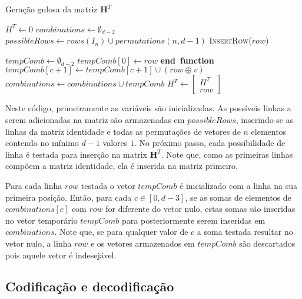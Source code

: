 \begin{algorithm}
\label{alg:geracao_matriz}
\caption{Geração gulosa da matriz $\textbf{H}^T$}
\begin{algorithmic}[1]
\State $H^T \gets 0$
\State $combinations \gets \emptyset_{d-2}$
\State $possibleRows \gets rows(I_n) \cup permutations(n, d - 1)$
    \State \textsc{InsertRow($row$)}
\EndFor

    \State $tempComb \gets \emptyset_{d-2}$
    \State $tempComb[0] \gets row$
                \State \textbf{end\ function}
            \EndIf
                \State $tempComb[c + 1] \gets tempComb[c+1] \cup (row \oplus v)$
            \EndIf
        \EndFor
    \EndFor
    \State $combinations \gets combinations \cup tempComb$
    \State $H^T \gets \begin{bmatrix} H^T \\ row \end{bmatrix}$
\EndFunction
\end{algorithmic}
\end{algorithm}

Neste código, primeiramente as variáveis são inicializadas. As possíveis linhas a serem adicionadas na matriz são armazenadas em $possibleRows$, inserindo-se as linhas da matriz identidade e todas as permutações de vetores de $n$ elementos contendo no mínimo $d - 1$ valores $1$. No próximo passo, cada possibilidade de linha é testada para inserção na matrix $\textbf{H}^T$. Note que, como as primeiras linhas compõem a matriz identidade, ela é inserida na matriz primeiro. 

Para cada linha $row$ testada o vetor $tempComb$ é inicializado com a linha na sua primeira posição. Então, para cada $c \in [0, d-3]$, se as somas de elementos de $combinations[c]$ com $row$ for diferente do vetor nulo, estas somas são inseridas no vetor temporário $tempComb$ para posteriormente serem inseridas em $combinations$. Note que, se para qualquer valor de $c$ a soma testada resultar no vetor nulo, a linha $row$ e os vetores armazenados em $tempComb$ são descartados pois aquele vetor é indesejável.

\subsection{Codificação e decodificação}


